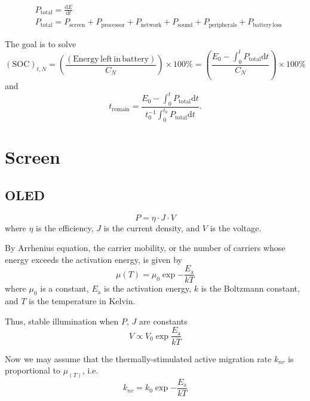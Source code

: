 \documentclass[12pt]{article}
\begin{document}
\begin{eqnarray}
	& P_\mathrm{total}=\frac{\mathrm dE}{\mathrm dt} \\
	& P_\mathrm{total}=P_\mathrm{screen}+P_\mathrm{processor}+P_\mathrm{network}+P_\mathrm{sound}+P_\mathrm{peripherals}+P_\mathrm{battery\,loss}
\end{eqnarray}

The goal is to solve
\begin{equation}
	(\mathrm{SOC})_{t,N}=\left(\frac{(\mathrm{Energy\,left\,in\,battery})}{C_N}\right)\times 100\%=\left(\frac{E_0-\int_0^t P_\mathrm{total}\mathrm dt}{C_N}\right)\times 100\%
\end{equation}
and
\begin{equation}
	t_\mathrm{remain}=\frac{E_0-\int_0^t P_\mathrm{total}\mathrm dt}{t_0^{-1}\int_0^{t_0}P_\mathrm{total}\mathrm dt}.
\end{equation}

\section{Screen}

\subsection{OLED}

\begin{equation}
	P=\eta\cdot J\cdot V
\end{equation}
where $\eta$ is the efficiency, $J$ is the current density, and $V$ is the voltage.

By Arrhenius equation, the carrier mobility, or the number of carriers whose energy exceeds the activation energy, is given by
\begin{equation}
	\mu(T)=\mu_0 \exp{-\frac{E_\mathrm{a}}{kT}}
\end{equation}
where $\mu_0$ is a constant, $E_\mathrm{a}$ is the activation energy, $k$ is the Boltzmann constant, and $T$ is the temperature in Kelvin.

Thus, stable illumination when $P,\,J$ are constants
\begin{equation}
	V\propto V_0\exp{\frac{E_\mathrm{a}}{kT}}
\end{equation}

Now we may assume that the thermally-stimulated active migration rate $k_{nr}$ is proportional to $\mu_(T)$, i.e.
\begin{equation}
	k_{nr}=k_0\exp{-\frac{E_\mathrm {a}}{kT}}
\end{equation}
\end{document}
